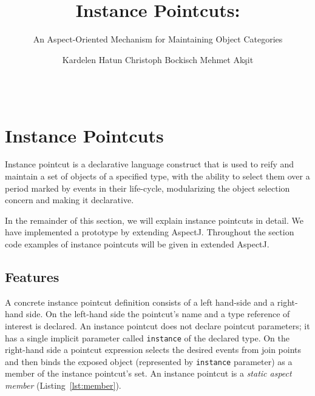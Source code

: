 \documentclass{acm_proc_article-sp}
\begin{document}
\title{Instance Pointcuts:}
\subtitle{An Aspect-Oriented Mechanism for Maintaining Object Categories}

\author{
\alignauthor
Kardelen Hatun \hspace{2cm} Christoph Bockisch \hspace{2cm} Mehmet Ak\c{s}it\\
\\
\\
}




\section{Instance Pointcuts}
Instance pointcut is a declarative language construct that is used to reify and maintain a set of objects of a specified type, with the ability to select them over a period marked by events in their life-cycle, modularizing the object selection concern and making it declarative. 
 
In the remainder of this section, we will explain instance pointcuts in detail. We have implemented a prototype by extending AspectJ. Throughout the section code examples of instance pointcuts will be given in extended AspectJ.


\subsection{Features}
\label{sec:features}

A concrete instance pointcut definition consists of a left hand-side and a right-hand side. 
On the left-hand side the pointcut's name and a type reference of interest is declared. 
An instance pointcut does not declare pointcut parameters; it has a single implicit parameter called \lstinline{instance} of the declared type. 
On the right-hand side a pointcut expression selects the desired events from join points and then binds the exposed object (represented by \lstinline{instance} parameter) as a member of the instance pointcut's set. 
An instance pointcut is a \emph{static aspect member} (Listing~\ref{lst:member}).%
\end{document}
